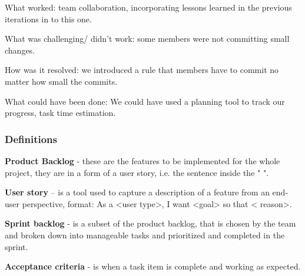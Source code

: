 \documentclass[10pt]{article}
\begin{document}
What worked: team collaboration, incorporating lessons learned in the previous iterations in to this one.

What was challenging/ didn’t work: some members were not committing small changes.

How was it resolved: we introduced a rule that members have to commit no matter how small the commits.

What could have been done: We could have used a planning tool to track our progress, task time estimation.

\subsubsection{Definitions}

\textbf{Product Backlog} - these are the features to be implemented for the whole project, they are in a form of a user story, i.e. the sentence inside the " ".

\textbf{User story} – is a tool used to capture a description of a feature from an end-user perspective, format: As a <user type>, I want <goal> so that < reason>.

\textbf{Sprint backlog} - is a subset of the product backlog, that is chosen by the team and broken down into manageable tasks and prioritized and completed in the sprint.

\textbf{Acceptance criteria} - is when a task item is complete and working as expected.
\end{document}
